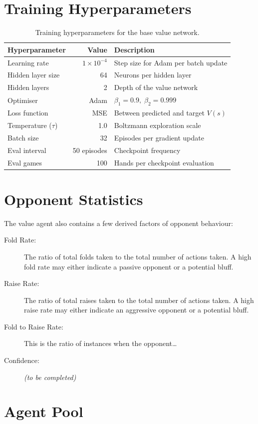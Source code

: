 \documentclass{article}
\begin{document}
\section{Training Hyperparameters}
\label{app:hyper}

\begin{table}[h]
\centering
\begin{tabular}{lrl}
\toprule
\textbf{Hyperparameter} & \textbf{Value} & \textbf{Description} \\
\midrule
Learning rate       & $1 \times 10^{-4}$  & Step size for Adam per batch update \\
Hidden layer size   & 64                   & Neurons per hidden layer \\
Hidden layers       & 2                    & Depth of the value network \\
Optimiser           & Adam                 & $\beta_1{=}0.9,\;\beta_2{=}0.999$ \\
Loss function       & MSE                  & Between predicted and target $V(s)$ \\
Temperature ($\tau$)& 1.0                  & Boltzmann exploration scale \\
Batch size          & 32                   & Episodes per gradient update \\
Eval interval       & 50 episodes          & Checkpoint frequency \\
Eval games          & 100                  & Hands per checkpoint evaluation \\
\bottomrule
\end{tabular}
\caption{Training hyperparameters for the base value network.}
\label{tab:hyper}
\end{table}

\section{Opponent Statistics}
\label{app:oppstats}

The value agent also contains a few derived factors of opponent behaviour:

\begin{description}
\item[Fold Rate:] The ratio of total folds taken to the total number of actions taken. A high fold rate may either indicate a passive opponent or a potential bluff.
\item[Raise Rate:] The ratio of total raises taken to the total number of actions taken. A high raise rate may either indicate an aggressive opponent or a potential bluff.
\item[Fold to Raise Rate:] This is the ratio of instances when the opponent\ldots
\item[Confidence:] \emph{(to be completed)}
\end{description}

\section{Agent Pool}
\label{app:pool}

\end{document}
